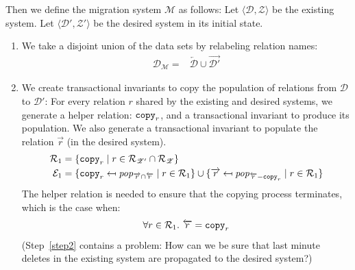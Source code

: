 \documentclass[runningheads]{llncs}
\newcommand{\id}[1]{\text{\it #1\/}}
\newcommand{\popF}[1]{\id{pop}_{#1}}
\newcommand{\pair}[2]{\langle{#1},{#2}\rangle}
\newcommand{\rels}{\mathcal{R}}   %
\newcommand{\transactions}{\mathcal{E}}
\newcommand{\dataset}{\mathscr{D}}
\newcommand{\schema}{\mathscr{Z}}
\newcommand{\migrsys}{\mathscr{M}}
\begin{document}
   Then we define the migration system $\migrsys$ as follows:
   Let $\pair{\dataset}{\schema}$ be the existing system.
   Let $\pair{\dataset'}{\schema'}$ be the desired system in its initial state.
\begin{enumerate}
\item We take a disjoint union of the data sets by relabeling relation names:
   \begin{align}
      \dataset_\migrsys={}&\overleftarrow{\dataset}\cup\overrightarrow{\dataset'}
   \end{align}
\item\label{step2} We create transactional invariants to copy the population of relations from $\dataset$ to $\dataset'$:
For every relation $r$ shared by the existing and desired systems, we generate a helper relation: ${\tt copy}_r$, and a transactional invariant to produce its population.
We also generate a transactional invariant to populate the relation $\overrightarrow{r}$ (in the desired system).
   \begin{align}
      \rels_1={}&\{{\tt copy}_r\mid r \in \rels_{\schema'}\cap\rels_{\schema}\}\\
      \transactions_1={}&\{{\tt copy}_r\mapsfrom \popF{\overrightarrow{r}\cap\overleftarrow{r}} \mid r \in\rels_1\}\cup\{\overrightarrow{r}\mapsfrom \popF{\overleftarrow{r}-{\tt copy}_r} \mid r \in\rels_1\}
   \end{align}
   The helper relation is needed to ensure that the copying process terminates,
   which is the case when:
   \begin{align}
      \forall r\in\rels_1.~\overleftarrow{r}={\tt copy}_r\label{eqn:copyingTerminates}
   \end{align}
   (Step~\ref{step2} contains a problem: How can we be sure that last minute deletes in the existing system are propagated to the desired system?)


\end{enumerate}
\end{document}
